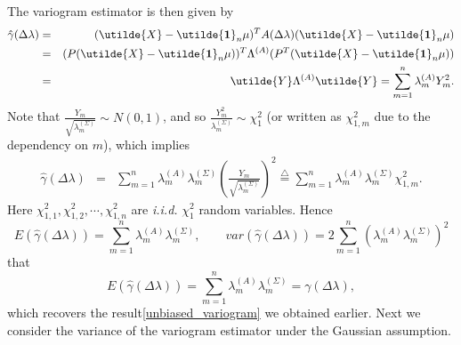 The variogram estimator is then given by
\begin{eqnarray*}
\hat{\gamma}(\Delta \lambda) &=& (\utilde{X}-\utilde{\bf 1}_n\mu)^T A(\Delta \lambda)(\utilde{X}-\utilde{\bf 1}_n\mu) \\
&=& (P(\utilde{X}-\utilde{\bf 1}_n\mu))^T \Lambda^{(A)} (P^T(\utilde{X}-\utilde{\bf 1}_n\mu))  \\
&=& \utilde{Y} \Lambda^{(A)} \utilde{Y} = \sum_{m = 1}^n \lambda_m^{(A)} Y_m^2.
\end{eqnarray*}
Note that $\frac{Y_m}{\sqrt{\lambda_m^{(\Sigma)}}} \sim N(0, 1)$, and so $\frac{Y_m^2}{\lambda_m^{(\Sigma)}} \sim \chi_1^2$ (or written as $\chi_{1, m}^2$ due to the dependency on $m$), which implies
\begin{eqnarray*}
\hat{\gamma}(\Delta \lambda) &=& \sum_{m = 1}^n \lambda_m^{(A)} \lambda_m^{(\Sigma)} \left(\frac{Y_m}{\sqrt{\lambda_m^{(\Sigma)}}}\right)^2 \stackrel{\triangle}{=} \sum_{m = 1}^n \lambda_m^{(A)} \lambda_m^{(\Sigma)} \chi_{1,m}^2.
\end{eqnarray*}
Here $\chi_{1, 1}^2, \chi_{1, 2}^2, \cdots, \chi_{1, n}^2$ are {\em i.i.d.} $\chi_1^2$ random variables. Hence
\[
E(\hat{\gamma}(\Delta \lambda)) = \sum_{m = 1}^n \lambda_m^{(A)} \lambda_m^{(\Sigma)}, \quad \quad var(\hat{\gamma}(\Delta \lambda)) = 2 \sum_{m = 1}^n (\lambda_m^{(A)} \lambda_m^{(\Sigma)})^2
\]
that
\[
E(\hat{\gamma}(\Delta \lambda)) = \sum_{m = 1}^n \lambda_m^{(A)} \lambda_m^{(\Sigma)} = \gamma(\Delta \lambda),
\]
which recovers the result\eqref{unbiased_variogram} we obtained earlier. Next we consider the variance of the variogram estimator under the Gaussian assumption. \\

